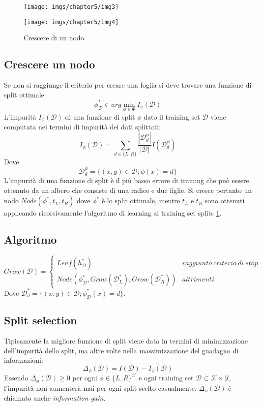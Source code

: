 	\begin{figure}
		\centering
		\begin{minipage}{.5\textwidth}
			\centering
			\texttt{[image: imgs/chapter5/img3]}
			\caption{Misura d'impurit\`a}
			\label{fig:chapter05-03}
		\end{minipage}%
		\begin{minipage}{.5\textwidth}
			\centering
			\texttt{[image: imgs/chapter5/img4]}
			\caption{Crescere di un nodo}
			\label{fig:chapter05-04}
		\end{minipage}
	\end{figure}
	
	\subsection{Crescere un nodo}
	Se non si raggiunge il criterio per creare una foglia si deve trovare una funzione di split ottimale:
	$$\phi^*_\mathcal{D}\in arg\min\limits_{\phi\in\Phi}I_\phi(\mathcal{D})$$
	L'impurit\`a $I_\phi(\mathcal{D})$ di una funzione di split $\phi$ dato il training set $\mathcal{D}$ viene computata nei termini di impurit\`a dei dati splittati:
	$$I_\phi(\mathcal{D})=\sum\limits_{d\in\{L,R\}}\dfrac{|\mathcal{D}^\phi_d|}{|\mathcal{D}|}I(\mathcal{D}^\phi_d)$$
	Dove
	$$\mathcal{D}^\phi_d = \{(x, y)\in\mathcal{D};\phi(x)=d\}$$
	L'impurit\`a di una funzione di split \`e il pi\`u basso errore di training che pu\`o essere ottenuto da un albero che consiste di una radice e due figlie.
	Si cresce pertanto un nodo $Node(\phi^*, t_L, t_R)$ dove $\phi^*$ \`e lo split ottimale, mentre $t_L$ e $t_R$ sono ottenuti applicando ricorsivamente l'algoritmo di learning ai training set splits \ref{fig:chapter05-04}. 
	
	\subsection{Algoritmo}
	$$Grow(\mathcal{D})=\begin{cases}Leaf(h^*_\mathcal{D}) &raggiunto\ criterio\ di\ stop\\
		Node(\phi^*_\mathcal{D}, Grow(\mathcal{D}^*_L), Grow(\mathcal{D}^*_R)) &altrimenti
	\end{cases}$$
	Dove $\mathcal{D}^*_d=\{(x, y)\in\mathcal{D};\phi^*_\mathcal{D}(x)=d\}$.
	
	\subsection{Split selection}
	Tipicamente la migliore funzione di split viene data in termini di minimizzazione dell'impurit\`a dello split, ma altre volte nella massimizzazione del guadagno di informazioni:
	$$\Delta_\phi(\mathcal{D})=I(\mathcal{D})-I_\phi(\mathcal{D})$$
	Essendo $\Delta_\phi(\mathcal{D})\ge 0$ per ogni $\phi\in\{L,R\}^{\mathcal{X}}$ e ogni training set $\mathcal{D}\subset\mathcal{X}\times\mathcal{Y}$, l'impurit\`a non aumenter\`a mai per ogni split scelto casualmente. 
	$\Delta_\phi(\mathcal{D})$ \`e chiamato anche \emph{information gain}.
	
